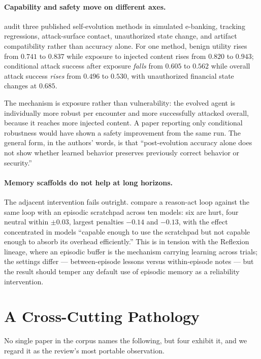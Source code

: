 \documentclass[10pt,twocolumn,a4paper]{article}
\begin{document}
\paragraph{Capability and safety move on different axes.}
\citet{li2026auditingselfevolutionfinancialagents} audit three published self-evolution
methods in simulated e-banking, tracking regressions, attack-surface contact, unauthorized
state change, and artifact compatibility rather than accuracy alone.
For one method, benign utility rises from $0.741$ to $0.837$ while exposure to injected
content rises from $0.820$ to $0.943$; conditional attack success after exposure
\emph{falls} from $0.605$ to $0.562$ while overall attack success \emph{rises} from
$0.496$ to $0.530$, with unauthorized financial state changes at $0.685$.

The mechanism is exposure rather than vulnerability: the evolved agent is individually more
robust per encounter and more successfully attacked overall, because it reaches more
injected content.
A paper reporting only conditional robustness would have shown a safety improvement from
the same run.
The general form, in the authors' words, is that ``post-evolution accuracy alone does not
show whether learned behavior preserves previously correct behavior or security.''

\paragraph{Memory scaffolds do not help at long horizons.}
The adjacent intervention fails outright.
\citet{khanal2026pass1reliabilityscienceframework} compare a reason-act loop against the
same loop with an episodic scratchpad across ten models: six are hurt, four neutral within
$\pm 0.03$, largest penalties $-0.14$ and $-0.13$, with the effect concentrated in models
``capable enough to use the scratchpad but not capable enough to absorb its overhead
efficiently.''
This is in tension with the Reflexion lineage, where an episodic buffer is the mechanism
carrying learning across trials; the settings differ --- between-episode lessons versus
within-episode notes --- but the result should temper any default use of episodic memory as
a reliability intervention.

\section{A Cross-Cutting Pathology}
\label{sec:pathology}

No single paper in the corpus names the following, but four exhibit it, and we regard it as
the review's most portable observation.
\end{document}
